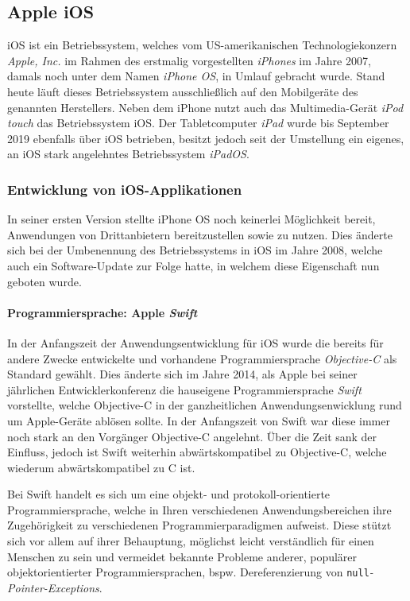 \subsection{Apple iOS}

iOS ist ein Betriebssystem, welches vom US-amerikanischen Technologiekonzern \textit{Apple, Inc.} im Rahmen des erstmalig vorgestellten \textit{iPhones} im Jahre 2007, damals noch unter dem Namen \textit{iPhone OS}, in Umlauf gebracht wurde. Stand heute läuft dieses Betriebssystem ausschließlich auf den Mobilgeräte des genannten Herstellers. Neben dem iPhone nutzt auch das Multimedia-Gerät \textit{iPod touch} das Betriebssystem iOS. Der Tabletcomputer \textit{iPad} wurde bis September 2019 ebenfalls über iOS betrieben, besitzt jedoch seit der Umstellung ein eigenes, an iOS stark angelehntes Betriebssystem \textit{iPadOS}.

\subsubsection{Entwicklung von iOS-Applikationen}

In seiner ersten Version stellte iPhone OS noch keinerlei Möglichkeit bereit, Anwendungen von Drittanbietern bereitzustellen sowie zu nutzen. Dies änderte sich bei der Umbenennung des Betriebssystems in iOS im Jahre 2008, welche auch ein Software-Update zur Folge hatte, in welchem diese Eigenschaft nun geboten wurde.

\paragraph{Programmiersprache: Apple \textit{Swift}}
In der Anfangszeit der Anwendungsentwicklung für iOS wurde die bereits für andere Zwecke entwickelte und vorhandene Programmiersprache \textit{Objective-C} als Standard gewählt. Dies änderte sich im Jahre 2014, als Apple bei seiner jährlichen Entwicklerkonferenz die hauseigene Programmiersprache \textit{Swift} vorstellte, welche Objective-C in der ganzheitlichen Anwendungsenwicklung rund um Apple-Geräte ablösen sollte. In der Anfangszeit von Swift war diese immer noch stark an den Vorgänger Objective-C angelehnt. Über die Zeit sank der Einfluss, jedoch ist Swift weiterhin abwärtskompatibel zu Objective-C, welche wiederum abwärtskompatibel zu C ist.

Bei Swift handelt es sich um eine objekt- und protokoll-orientierte Programmiersprache, welche in Ihren verschiedenen Anwendungsbereichen ihre Zugehörigkeit zu verschiedenen Programmierparadigmen aufweist. Diese stützt sich vor allem auf ihrer Behauptung, möglichst leicht verständlich für einen Menschen zu sein und vermeidet bekannte Probleme anderer, populärer objektorientierter Programmiersprachen, bspw. Dereferenzierung von \texttt{null}\textit{-Pointer-Exceptions}.


